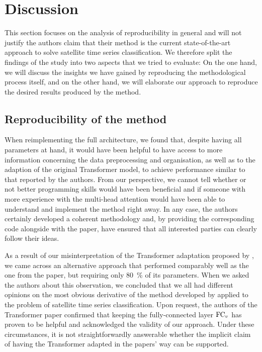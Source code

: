 \section{Discussion}

This section focuses on the analysis of reproducibility in general and will not justify the authors claim that their method is the current state-of-the-art approach to solve satellite time series classification.
We therefore split the findings of the study into two aspects that we tried to evaluate:
On the one hand, we will discuss the insights we have gained by reproducing the methodological process itself, and on the other hand, we will elaborate our approach to reproduce the desired results produced by the method.

\subsection{Reproducibility of the method}

When reimplementing the full architecture, we found that, despite having all parameters at hand, it would have been helpful to have access to more information concerning the data preprocessing and organisation, as well as to the adaption of the original Transformer model, to achieve performance similar to that reported by the authors.
From our perspective, we cannot tell whether or not better \python programming skills would have been beneficial and if someone with more experience with the multi-head attention would have been able to understand and implement the method right away.
In any case, the authors certainly developed a coherent methodology and, by providing the corresponding code alongside with the paper, have ensured that all interested parties can clearly follow their ideas.

As a result of our misinterpretation of the Transformer adaptation proposed by \citeauthor{Garnot20:SIT}, we came across an alternative approach that performed comparably well as the one from the paper, but requiring only \SI{80}{\percent} of its parameters.
When we asked the authors about this observation, we concluded that we all had different opinions on the most obvious derivative of the method developed by \citeauthor{Vaswani17:Attention} applied to the problem of satellite time series classification.
Upon request, the authors of the Transformer paper confirmed that keeping the fully-connected layer $\operatorname{FC}_v$ has proven to be helpful and acknowledged the validity of our approach.
Under these circumstances, it is not straightforwardly answerable whether the implicit claim of having the Transformer adapted in the papers' way can be supported.

